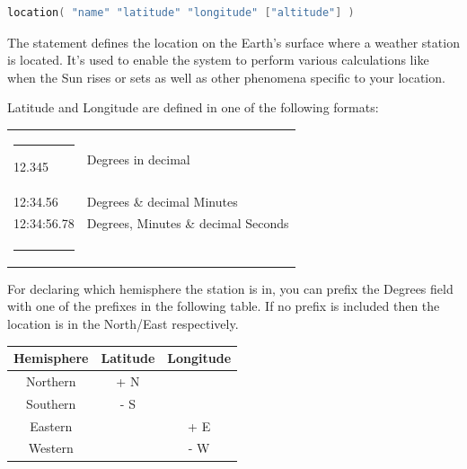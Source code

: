 \label{config:location}

\begin{lstlisting}[language=Go,style=kaolstplain]
location( "name" "latitude" "longitude" ["altitude"] )
\end{lstlisting}

The  statement defines the location on the Earth's surface
where a weather station is located.
It's used to enable the system to perform various calculations like when the Sun
rises or sets as well as other phenomena specific to your location.


Latitude and Longitude are defined in one of the following formats:

\begin{table}[hb]
    \raggedright
    \begin{tabular}{ l|l }
        \hrule
            12.345      & Degrees in decimal \\
            12:34.56    & Degrees \& decimal Minutes \\
            12:34:56.78 & Degrees, Minutes \& decimal Seconds \\
        \hrule
    \end{tabular}
\end{table}

For declaring which hemisphere the station is in, you can prefix the Degrees field with one of the prefixes
in the following table.
If no prefix is included then the location is in the North/East respectively.

\begin{table}[hb]
    \begin{tabular}{ c c c }
        \toprule
        Hemisphere & Latitude & Longitude \\
        \midrule
        Northern    & + N   & \\
        Southern    & - S   & \\
        \midrule
        Eastern     &       & + E \\
        Western     &       & - W \\
        \bottomrule
    \end{tabular}
\end{table}


